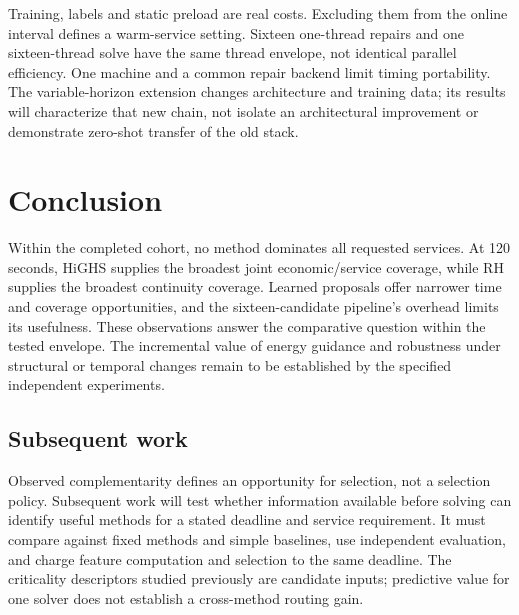 Training, labels and static preload are real costs. Excluding them from the
online interval defines a warm-service setting. Sixteen one-thread repairs
and one sixteen-thread solve have the same thread envelope, not identical
parallel efficiency. One machine and a common repair backend limit timing
portability. The variable-horizon extension changes architecture and training
data; its results will characterize that new chain, not isolate an
architectural improvement or demonstrate zero-shot transfer of the old stack.

\section{Conclusion}
Within the completed cohort, no method dominates all requested services.
At 120 seconds, HiGHS supplies the broadest joint economic/service coverage,
while RH supplies the broadest continuity coverage. Learned proposals offer
narrower time and coverage opportunities, and the sixteen-candidate pipeline's
overhead limits its usefulness. These observations answer the comparative
question within the tested envelope. The incremental value of energy guidance
and robustness under structural or temporal changes remain to be established
by the specified independent experiments.

\subsection*{Subsequent work}
Observed complementarity defines an opportunity for selection, not a selection
policy. Subsequent work will test whether information available before solving
can identify useful methods for a stated deadline and service requirement.
It must compare against fixed methods and simple baselines, use independent
evaluation, and charge feature computation and selection to the same deadline.
The criticality descriptors studied previously are candidate inputs; predictive
value for one solver does not establish a cross-method routing gain.

\appendix

\begingroup{}

\endgroup

